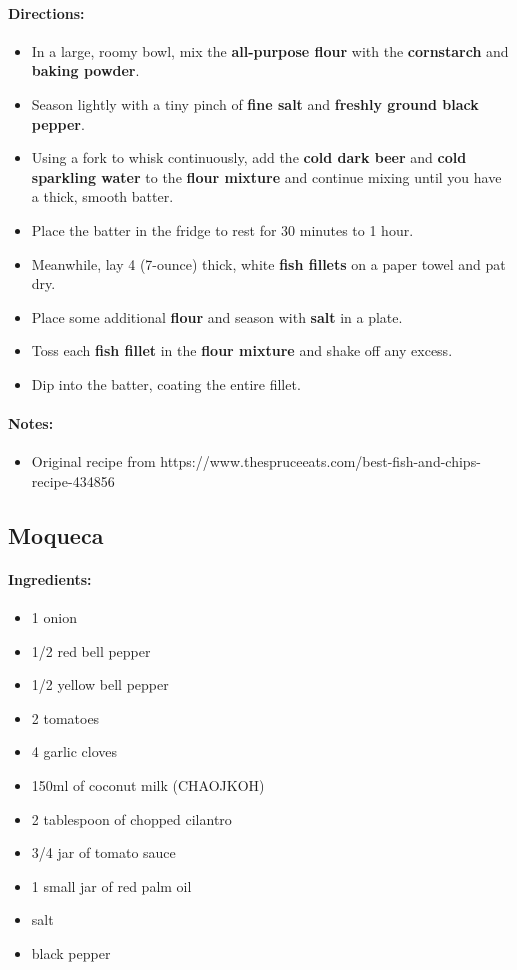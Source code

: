 \documentclass{article}
\begin{document}
\paragraph{Directions:}
\begin{itemize}
    \item In a large, roomy bowl, mix the \textbf{all-purpose flour} with the \textbf{cornstarch} and \textbf{baking powder}.
    \item Season lightly with a tiny pinch of \textbf{fine salt} and \textbf{freshly ground black pepper}.
    \item Using a fork to whisk continuously, add the \textbf{cold dark beer} and \textbf{cold sparkling water} to the \textbf{flour mixture} and continue mixing until you have a thick, smooth batter.
    \item Place the batter in the fridge to rest for 30 minutes to 1 hour.
    \item Meanwhile, lay 4 (7-ounce) thick, white \textbf{fish fillets} on a paper towel and pat dry.
    \item Place some additional \textbf{flour} and season with \textbf{salt} in a plate.
    \item Toss each \textbf{fish fillet} in the \textbf{flour mixture} and shake off any excess.
    \item Dip into the batter, coating the entire fillet.
\end{itemize}

\paragraph{Notes:}
\begin{itemize}
    \item Original recipe from https://www.thespruceeats.com/best-fish-and-chips-recipe-434856
\end{itemize}

\subsection{Moqueca}

\paragraph{Ingredients:}
\begin{itemize}
    \item 1 onion
    \item 1/2 red bell pepper
    \item 1/2 yellow bell pepper
    \item 2 tomatoes
    \item 4 garlic cloves
    \item 150ml of coconut milk (CHAOJKOH)
    \item 2 tablespoon of chopped cilantro
    \item 3/4 jar of tomato sauce
    \item 1 small jar of red palm oil
    \item salt
    \item black pepper
\end{itemize}
\end{document}

